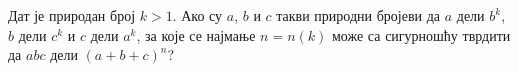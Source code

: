 \problem
Дат је природан број $k > 1$.
Ако су $a$, $b$ и $c$ такви природни бројеви да $a$ дели $b^k$, $b$ дели $c^k$
и $c$ дели $a^k$, за које се најмање $n = n(k)$ може са сигурношћу тврдити да
$a b c$ дели $(a + b + c)^n$?

\solution

\endproblem
